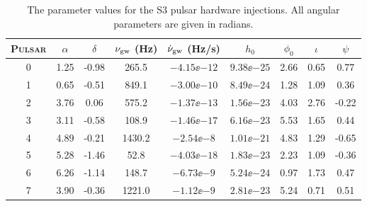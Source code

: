 \begin{table}[!htbp]
\caption[The parameter values for the S3 pulsar hardware injections.]{\label{S3InjectionParams} The
parameter values for the S3 pulsar hardware injections. All angular parameters are given in
radians.}
\begin{center}
\begin{tabular}{c | c c c c c c c c}
P\textsc{ulsar} & $\alpha$ & $\delta$& $\nu_{\rm gw}$ (Hz) & $\dot{\nu}_{\rm gw}$
(Hz/s) & $h_0$ & $\phi_0$ & $\iota$& $\psi$ \\
\hline
\footnotesize{0} & \footnotesize{1.25} & \footnotesize{-0.98} & \footnotesize{265.5} &
\footnotesize{$-4.15\ee{-12}$} & \footnotesize{$9.38\ee{-25}$} & \footnotesize{2.66} &
\footnotesize{0.65} & \footnotesize{0.77} \\
\footnotesize{1} & \footnotesize{0.65} & \footnotesize{-0.51} & \footnotesize{849.1} &
\footnotesize{$-3.00\ee{-10}$} & \footnotesize{$8.49\ee{-24}$} & \footnotesize{1.28} &
\footnotesize{1.09} & \footnotesize{0.36} \\
\footnotesize{2} & \footnotesize{3.76} &\footnotesize{0.06} & \footnotesize{575.2} &
\footnotesize{$-1.37\ee{-13}$} & \footnotesize{$1.56\ee{-23}$} & \footnotesize{4.03} &
\footnotesize{2.76} & \footnotesize{-0.22} \\
\footnotesize{3} & \footnotesize{3.11} & \footnotesize{-0.58} & \footnotesize{108.9} &
\footnotesize{$-1.46\ee{-17}$} & \footnotesize{$6.16\ee{-23}$} & \footnotesize{5.53} &
\footnotesize{1.65} & \footnotesize{0.44} \\
\footnotesize{4} & \footnotesize{4.89} & \footnotesize{-0.21} & \footnotesize{1430.2} &
\footnotesize{$-2.54\ee{-8}$} & \footnotesize{$1.01\ee{-21}$} & \footnotesize{4.83} &
\footnotesize{1.29} & \footnotesize{-0.65} \\
\footnotesize{5} & \footnotesize{5.28} & \footnotesize{-1.46} & \footnotesize{52.8} &
\footnotesize{$-4.03\ee{-18}$} & \footnotesize{$1.83\ee{-23}$} & \footnotesize{2.23} &
\footnotesize{1.09} & \footnotesize{-0.36} \\
\footnotesize{6} & \footnotesize{6.26} & \footnotesize{-1.14} & \footnotesize{148.7} &
\footnotesize{$-6.73\ee{-9}$} & \footnotesize{$5.24\ee{-24}$} & \footnotesize{0.97} &
\footnotesize{1.73} & \footnotesize{0.47} \\
\footnotesize{7} & \footnotesize{3.90} & \footnotesize{-0.36} &\footnotesize{1221.0} &
\footnotesize{$-1.12\ee{-9}$} & \footnotesize{$2.81\ee{-23}$} & \footnotesize{5.24} &
\footnotesize{0.71} & \footnotesize{0.51} \\

\end{tabular}
\end{center}
\end{table}
